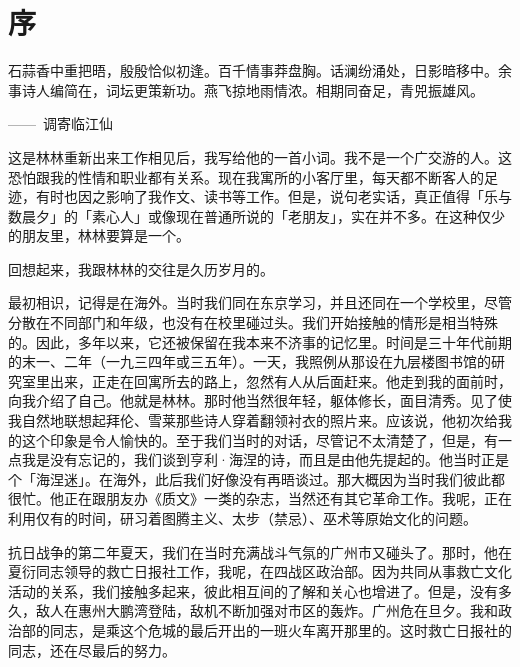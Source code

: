 
\chapter{\FK 序}

{\FS

    \hfill\parbox{0.5\textwidth}{\FK
        石蒜香中重把晤，殷殷恰似初逢。百千情事莽盘胸。话澜纷涌处，日影暗移中。余事诗人编简在，词坛更策新功。燕飞掠地雨情浓\footnotemark[1]。相期同奋足，青兕振雄风。

        \hfill——~调寄临江仙
    }


    \bigskip

    这是林林重新出来工作相见后，我写给他的一首小词。我不是一个广交游的人。这恐怕跟我的性情和职业都有关系。现在我寓所的小客厅里，每天都不断客人的足迹，有时也因之影响了我作文、读书等工作。但是，说句老实话，真正值得「乐与数晨夕」的「素心人」或像现在普通所说的「老朋友」，实在并不多。在这种仅少的朋友里，林林要算是一个。

    回想起来，我跟林林的交往是久历岁月的。

    最初相识，记得是在海外。当时我们同在东京学习，并且还同在一个学校里，尽管分散在不同部门和年级，也没有在校里碰过头。我们开始接触的情形是相当特殊的。因此，多年以来，它还被保留在我本来不济事的记忆里。时间是三十年代前期的末一、二年（一九三四年或三五年）。一天，我照例从那设在九层楼图书馆的研究室里出来，正走在回寓所去的路上，忽然有人从后面赶来。他走到我的面前时，向我介绍了自己。他就是林林。那时他当然很年轻，躯体修长，面目清秀。见了使我自然地联想起拜伦、雪莱那些诗人穿着翻领衬衣的照片来。应该说，他初次给我的这个印象是令人愉快的。至于我们当时的对话，尽管记不太清楚了，但是，有一点我是没有忘记的，我们谈到亨利·海涅的诗，而且是由他先提起的。他当时正是个「海涅迷」。在海外，此后我们好像没有再晤谈过。那大概因为当时我们彼此都很忙。他正在跟朋友办《质文》一类的杂志，当然还有其它革命工作。我呢，正在利用仅有的时间，研习着图腾主义、太步（禁忌）、巫术等原始文化的问题。

    抗日战争的第二年夏天，我们在当时充满战斗气氛的广州市又碰头了。那时，他在夏衍同志领导的救亡日报社工作，我呢，在四战区政治部。因为共同从事救亡文化活动的关系，我们接触多起来，彼此相互间的了解和关心也增进了。但是，没有多久，敌人在惠州大鹏湾登陆，敌机不断加强对市区的轰炸。广州危在旦夕。我和政治部的同志，是乘这个危城的最后开出的一班火车离开那里的。这时救亡日报社的同志，还在尽最后的努力。

}
